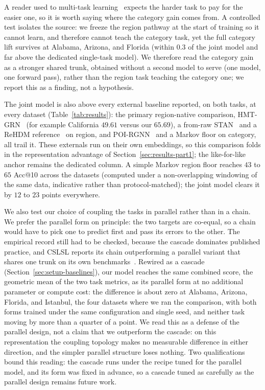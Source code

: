 A reader used to multi-task learning~\cite{caruana1997multitask} expects the
harder task to pay for the easier one, so it is worth saying where the category
gain comes from. A controlled test isolates the source: we freeze the region
pathway at the start of training so it cannot learn, and therefore cannot teach
the category task, yet the full category lift survives at Alabama, Arizona, and
Florida (within $0.3$ of the joint model and far above the dedicated single-task
model). We therefore read the category gain as a stronger shared trunk, obtained
without a second model to serve (one model, one forward pass), rather than the region
task teaching the category one; we report this as a finding, not a hypothesis.

The joint model is also above every external baseline reported, on both tasks,
at every dataset (Table~\ref{tab:results}): the primary region-native comparison,
HMT-GRN~\cite{lim2022hmtgrn} (for example California $49.61$ versus our $65.69$),
a from-raw STAN~\cite{luo2021stan} and a ReHDM reference~\cite{li2025rehdm} on
region, and POI-RGNN~\cite{capanema2023poirgnn} and a Markov floor on category,
all trail it. These externals run on their own embeddings, so this comparison
folds in the representation advantage of Section~\ref{sec:results-part1}; the
like-for-like anchor remains the dedicated column. A simple Markov region floor
reaches $43$ to $65$ Acc@10 across the datasets (computed under a
non-overlapping windowing of the same data, indicative rather than
protocol-matched); the joint model clears it by $12$ to $23$ points everywhere.

We also test our choice of coupling the tasks in parallel rather
than in a chain. We prefer the parallel form on principle: the two targets are
co-equal, so a chain would have to pick one to predict first and pass its
errors to the other. The empirical record still had to be checked, because the
cascade dominates published practice, and CSLSL reports its chain
outperforming a parallel variant that shares one trunk on its own
benchmarks~\cite{huang2024cslsl}. Rewired as a cascade
(Section~\ref{sec:setup-baselines}), our model reaches the same combined
score, the geometric mean of the two task metrics, as its parallel form at no
additional parameter or compute cost: the difference is about zero at Alabama,
Arizona, Florida, and Istanbul, the four datasets where we ran the comparison,
with both forms trained under the same configuration and single seed, and
neither task moving by more than a quarter of a point. We read this as a defense of the
parallel design, not a claim that we outperform the cascade: on this
representation the coupling topology makes no measurable difference in either
direction, and the simpler parallel structure loses nothing. Two qualifications bound this
reading: the cascade runs under the recipe tuned for the parallel model, and
its form was fixed in advance, so a cascade tuned as carefully as the parallel
design remains future work.

